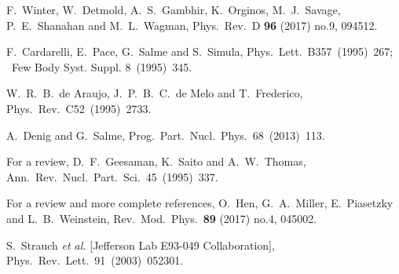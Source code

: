\documentclass[preprint,aps,showpacs,floatfix]{revtex4}
\begin{document}
\begin{thebibliography}{99}
  F.~Winter, W.~Detmold, A.~S.~Gambhir, K.~Orginos, M.~J.~Savage, P.~E.~Shanahan and M.~L.~Wagman,
  Phys.\ Rev.\ D {\bf 96} (2017) no.9,  094512.


  
  F.~Cardarelli, E.~Pace, G.~Salme and S.~Simula,
  Phys.\ Lett.\ B357~(1995)~267; %
  ~Few Body Syst. Suppl. 8~(1995)~345.

  
  
  W.~R.~B.~de Araujo, J.~P.~B.~C.~de Melo and T.~Frederico,
  Phys.\ Rev.\ C52~(1995)~2733. %
  

 
  A.~Denig and G.~Salme,
  Prog.\ Part.\ Nucl.\ Phys.\  68~(2013)~113. %

  
  
  For a review, D.~F.~Geesaman, K.~Saito and A.~W.~Thomas,
  Ann.\ Rev.\ Nucl.\ Part.\ Sci.~45~(1995)~337.   %
  
 
  For a review and more complete references, O.~Hen, G.~A.~Miller, E.~Piasetzky and L.~B.~Weinstein,
  Rev.\ Mod.\ Phys.\  {\bf 89} (2017) no.4,  045002.

  S.~Strauch {\it et al.} [Jefferson Lab E93-049 Collaboration],
  Phys.\ Rev.\ Lett.\ 91~(2003)~052301.   %
  

\end{thebibliography}
\end{document}
